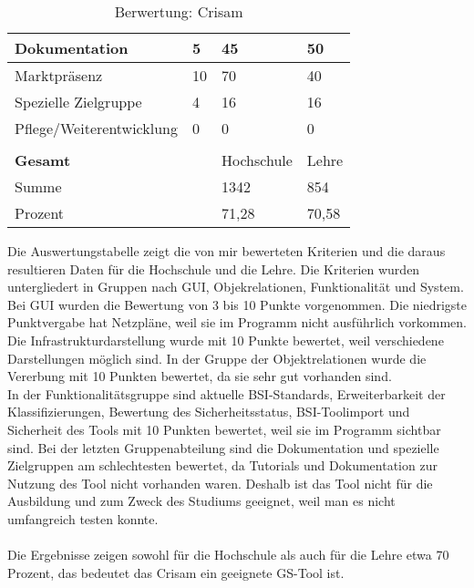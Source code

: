 \documentclass{book}
\begin{document}
\begin{table}[h]
\begin{tabular}{|p{}|p{}|p{}|p{}|}
\hline
Dokumentation & 5 & 45 & 50 \\
\hline
Marktpräsenz & 10 & 70 & 40 \\
\hline
Spezielle Zielgruppe & 4 & 16 & 16 \\
\hline
Pflege/Weiterentwicklung & 0 & 0 & 0\\
\hline
\multicolumn{4}{c}{}{}{}\\
\hline
\textbf{Gesamt} & {} & {Hochschule} & {Lehre}\\
\hline
Summe & & 1342 & 854\\
\hline
Prozent & & 71,28 & 70,58 \\
\hline
\end{tabular} 
\caption{Berwertung: Crisam}
\label{tab:Berwertung Crisam}
\end{table}
Die Auswertungstabelle zeigt die von mir bewerteten Kriterien und die daraus resultieren Daten für die Hochschule und die Lehre. 
Die Kriterien wurden untergliedert in Gruppen nach GUI, Objekrelationen, Funktionalität und System.
\\
Bei GUI wurden die Bewertung von 3 bis 10 Punkte vorgenommen. 
Die niedrigste Punktvergabe hat Netzpläne, weil sie im Programm nicht ausführlich vorkommen.
\\
Die Infrastrukturdarstellung wurde mit 10 Punkte bewertet, weil verschiedene Darstellungen möglich sind.
In der Gruppe der Objektrelationen wurde die Vererbung mit 10 Punkten bewertet, da sie sehr gut vorhanden sind.
\\
In der Funktionalitätsgruppe sind aktuelle BSI-Standards, Erweiterbarkeit der Klassifizierungen, Bewertung des Sicherheitsstatus, BSI-Toolimport und Sicherheit des Tools mit 10 Punkten bewertet, weil sie im Programm sichtbar sind.
Bei der letzten Gruppenabteilung sind die Dokumentation und spezielle Zielgruppen am schlechtesten bewertet, da Tutorials und Dokumentation zur Nutzung des Tool nicht vorhanden waren. Deshalb ist das Tool nicht für die Ausbildung und zum Zweck des Studiums geeignet, weil man es nicht umfangreich testen konnte.
\\
\\
Die Ergebnisse zeigen sowohl für die Hochschule als auch für die Lehre etwa 70 Prozent, das bedeutet das Crisam ein geeignete GS-Tool ist.
\end{document}
